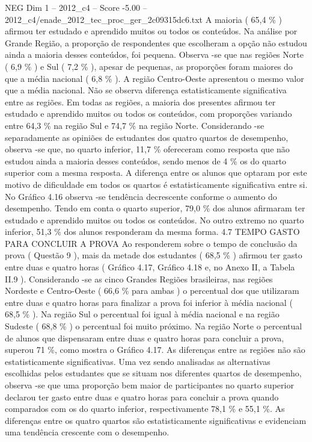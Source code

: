 \begin{textsample}{NEG Dim 1 – 2012\_c4 – Score -5.00 – 2012\_c4/enade\_2012\_tec\_proc\_ger\_2c09315dc6.txt}
A maioria ( 65,4 \% ) afirmou ter estudado e aprendido muitos ou todos os conteúdos.
Na análise por Grande Região, a proporção de respondentes que escolheram a opção não estudou ainda a maioria desses conteúdos, foi pequena.
Observa -se que nas regiões Norte ( 6,9 \% ) e Sul ( 7,2 \% ), apesar de pequenas, as proporções foram maiores do que a média nacional ( 6,8 \% ).
A região Centro-Oeste apresentou o mesmo valor que a média nacional.
Não se observa diferença estatisticamente significativa entre as regiões.
Em todas as regiões, a maioria dos presentes afirmou ter estudado e aprendido muitos ou todos os conteúdos, com proporções variando entre 64,3 \% na região Sul e 74,7 \% na região Norte.
Considerando -se separadamente as opiniões de estudantes dos quatro quartos de desempenho, observa -se que, no quarto inferior, 11,7 \% ofereceram como resposta que não estudou ainda a maioria desses conteúdos, sendo menos de 4 \% os do quarto superior com a mesma resposta.
A diferença entre os alunos que optaram por este motivo de dificuldade em todos os quartos é estatisticamente significativa entre si.
No Gráfico 4.16 observa -se tendência decrescente conforme o aumento do desempenho.
Tendo em conta o quarto superior, 79,0 \% dos alunos afirmaram ter estudado e aprendido muitos ou todos os conteúdos.
No outro extremo no quarto inferior, 51,3 \% dos alunos responderam da mesma forma. 4.7 TEMPO GASTO PARA CONCLUIR A PROVA Ao responderem sobre o tempo de conclusão da prova ( Questão 9 ), mais da metade dos estudantes ( 68,5 \% ) afirmou ter gasto entre duas e quatro horas ( Gráfico 4.17, Gráfico 4.18 e, no Anexo II, a Tabela II.9 ).
Considerando -se as cinco Grandes Regiões brasileiras, nas regiões Nordeste e Centro-Oeste ( 66,6 \% para ambas ) o percentual dos que utilizaram entre duas e quatro horas para finalizar a prova foi inferior à média nacional ( 68,5 \% ).
Na região Sul o percentual foi igual à média nacional e na região Sudeste ( 68,8 \% ) o percentual foi muito próximo.
Na região Norte o percentual de alunos que dispensaram entre duas e quatro horas para concluir a prova, superou 71 \%, como mostra o Gráfico 4.17.
As diferenças entre as regiões não são estatisticamente significativas.
Uma vez sendo analisadas as alternativas escolhidas pelos estudantes que se situam nos diferentes quartos de desempenho, observa -se que uma proporção bem maior de participantes no quarto superior declarou ter gasto entre duas e quatro horas para concluir a prova quando comparados com os do quarto inferior, respectivamente 78,1 \% e 55,1 \%.
As diferenças entre os quatro quartos são estatisticamente significativas e evidenciam uma tendência crescente com o desempenho.

\end{textsample}
